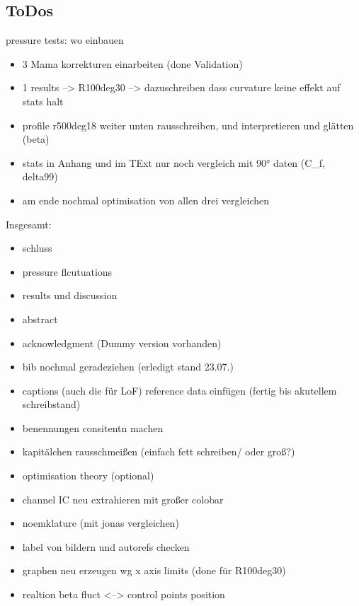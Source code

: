 \subsection{ToDos}


pressure tests: wo einbauen

\begin{itemize}
    \item 3 Mama korrekturen einarbeiten (done Validation)
    \item 1 results --> R100deg30 --> dazuschreiben dass curvature keine effekt auf stats halt
    \item profile r500deg18 weiter unten rausschreiben, und interpretieren und glätten (beta)
    \item stats in Anhang und im TExt nur noch vergleich mit 90° daten (C_f, delta99)
    \item am ende nochmal optimisation von allen drei vergleichen
\end{itemize}

Insgesamt: 
\begin{itemize}
    \item schluss 
    \item pressure flcutuations
    \item results und discussion
    \item abstract
    \item acknowledgment (Dummy version vorhanden)
    \item bib nochmal geradeziehen (erledigt stand 23.07.)
    \item captions (auch die für LoF) reference data einfügen (fertig bis akutellem schreibstand)
    \item benennungen consitentn machen
    \item kapitälchen rausschmeißen (einfach fett schreiben/ oder groß?)
    \item optimisation theory (optional)
    \item channel IC neu extrahieren mit großer colobar
    \item noemklature (mit jonas vergleichen)
    \item label von bildern und autorefs checken
    \item graphen neu erzeugen wg x axis limits (done für R100deg30)
    \item realtion beta fluct <--> control points position
\end{itemize}



